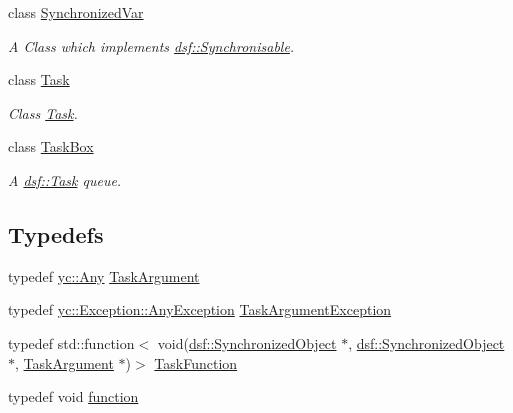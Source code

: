 \begin{DoxyCompactItemize}
class \hyperlink{classdsf_1_1_synchronized_var}{Synchronized\+Var}
\begin{DoxyCompactList}\small\item\em A Class which implements \hyperlink{classdsf_1_1_synchronisable}{dsf\+::\+Synchronisable}. \end{DoxyCompactList}\item 
class \hyperlink{classdsf_1_1_task}{Task}
\begin{DoxyCompactList}\small\item\em Class \hyperlink{classdsf_1_1_task}{Task}. \end{DoxyCompactList}\item 
class \hyperlink{classdsf_1_1_task_box}{Task\+Box}
\begin{DoxyCompactList}\small\item\em A \hyperlink{classdsf_1_1_task}{dsf\+::\+Task} queue. \end{DoxyCompactList}\end{DoxyCompactItemize}
\subsection*{Typedefs}
\begin{DoxyCompactItemize}
\item 
typedef \hyperlink{classyc_1_1_any}{yc\+::\+Any} \hyperlink{namespacedsf_abe4bf68433935a81c31a5ada9b17663a}{Task\+Argument}
\item 
typedef \hyperlink{classyc_1_1_exception_1_1_any_exception}{yc\+::\+Exception\+::\+Any\+Exception} \hyperlink{namespacedsf_af54027177bbfc0037be408a612d48b83}{Task\+Argument\+Exception}
\item 
typedef std\+::function$<$ void(\hyperlink{classdsf_1_1_synchronized_object}{dsf\+::\+Synchronized\+Object} $\ast$, \hyperlink{classdsf_1_1_synchronized_object}{dsf\+::\+Synchronized\+Object} $\ast$, \hyperlink{namespacedsf_abe4bf68433935a81c31a5ada9b17663a}{Task\+Argument} $\ast$)$>$ \hyperlink{namespacedsf_aa16e735f29587f4485b56fc46746f7a9}{Task\+Function}
\item 
typedef void \hyperlink{namespacedsf_a3ad20407a44eaf5ce4cf784a60c1b92b}{function}
\end{DoxyCompactItemize}
